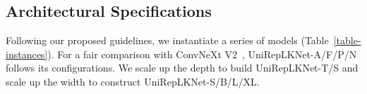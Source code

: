 \documentclass[10pt,twocolumn,letterpaper]{article}
\begin{document}
	\begin{table}
		\caption{Different numbers of LarK and SmaK Blocks in Stage 3.}
		\label{table-guide4}
		\vspace{-0.2in}
		\begin{center}
		\end{center}
		\vspace{-0.2in}
	\end{table}



\subsection{Architectural Specifications}\label{sec-}

Following our proposed guidelines, we instantiate a series of models (Table~\ref{table-instances}). For a fair comparison with ConvNeXt V2~\cite{woo2023convnext}, UniRepLKNet-A/F/P/N follows its configurations. We scale up the depth to build UniRepLKNet-T/S and scale up the width to construct UniRepLKNet-S/B/L/XL. 
\end{document}
